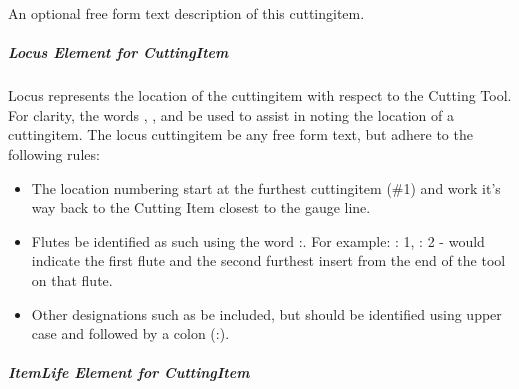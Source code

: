An optional free form text description of this \gls{cuttingitem}. 

\subparagraph{Locus Element for CuttingItem}\mbox{}

Locus represents the location of the \gls{cuttingitem} with respect to the Cutting Tool.  For clarity, the words , , and  \SHOULD be used to assist in noting the location of a \gls{cuttingitem}.  The \gls{locus cuttingitem} \MAY be any free form text, but \SHOULD adhere to the following rules: 

\begin{itemize}
    \item  The location numbering \SHOULD start at the furthest \gls{cuttingitem} (\#1) and work it’s way back to the Cutting Item closest to the gauge line. 
    \item Flutes \SHOULD be identified as such using the word :. For example: 
    \tab {}: 1, : 2 - would indicate the first flute and the second furthest insert from the end of the tool on that flute.
    \item Other designations such as  \MAY be included, but should be identified using upper case and followed by a colon (:).
\end{itemize}

\subparagraph{ItemLife Element for CuttingItem}\mbox{}

